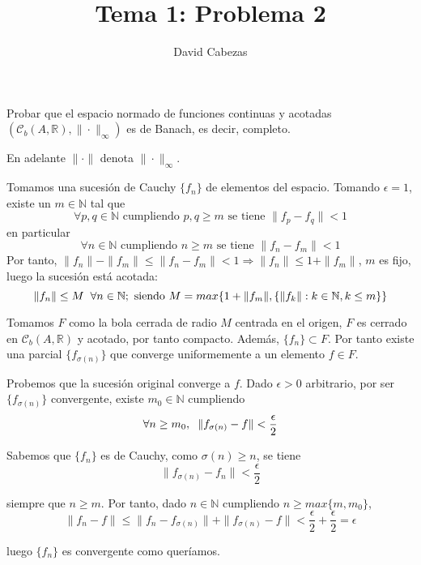 \documentclass{article}
\begin{document}
\title{Tema 1: Problema 2}
\author{David Cabezas}
\date{}
\maketitle
\begin{flushleft}
  Probar que el espacio normado de funciones continuas y
  acotadas $(\mathcal{C}_b(A,\mathbb{R}), \|\cdot\|_\infty)$ es
  de Banach, es decir, completo.

  En adelante $\|\cdot\|$ denota $\|\cdot\|_\infty$.

  Tomamos una sucesión de Cauchy $\{f_n\}$ de elementos del espacio.
  Tomando $\epsilon=1$, existe un $m \in \mathbb{N}$ tal que
  $$\forall p,q \in \mathbb{N} \text{ cumpliendo }  p,q \geq m \text{ se tiene } \|f_p - f_q\| < 1$$
  en particular
  $$\forall n \in \mathbb{N} \text{ cumpliendo } n \geq m \text{ se
    tiene } \|f_n - f_m\| < 1$$ Por tanto, $\|f_n\| - \|f_m\| \leq
  \|f_n - f_m\| < 1 \Rightarrow \|f_n\| \leq 1 + \|f_m\|$, $m$ es
  fijo, luego la sucesión está acotada:
  $$\|f_n\| \leq M \hspace{2mm} \forall n \in \mathbb{N}; \text{
    siendo } M = max\{1+\|f_m\|, \{\|f_k\| : k \in \mathbb{N}, k
  \leq m\}\}$$

  Tomamos $F$ como la bola cerrada de radio $M$ centrada en el origen,
  $F$ es cerrado en $\mathcal{C}_b(A,\mathbb{R})$ y acotado, por tanto
  compacto. Además, $\{f_n\} \subset F$. Por tanto existe una parcial
  $\{f_{\sigma(n)}\}$ que converge uniformemente a un elemento $f \in F$.

  Probemos que la sucesión original converge a $f$. Dado $\epsilon > 0$ arbitrario,
  por ser $\{f_{\sigma(n)}\}$ convergente, existe $m_0 \in \mathbb{N}$ cumpliendo
  $$\forall n \geq m_0, \hspace{2mm} \|f_{\sigma(n)} - f\| < \frac{\epsilon}{2}$$

  Sabemos que $\{f_n\}$ es de Cauchy, como $\sigma(n) \geq n$, se tiene
  $$\|f_{\sigma(n)} - f_n\| < \frac{\epsilon}{2}$$

  siempre que $n \geq m$. Por tanto, dado $n \in \mathbb{N}$ cumpliendo $n \geq max\{m, m_0\}$,
  $$\|f_n - f\| \leq \|f_n - f_{\sigma(n)}\| + \|f_{\sigma(n)} - f\| <
  \frac{\epsilon}{2} + \frac{\epsilon}{2} = \epsilon$$

  luego $\{f_n\}$ es convergente como queríamos.
\end{flushleft}
\end{document}
